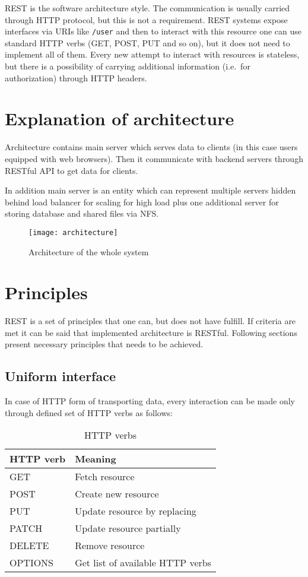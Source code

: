 REST is the software architecture style\cite{REST-wiki}. The communication is usually carried through HTTP protocol, but this is not a requirement. REST systems expose interfaces via URIs like\label{example-URI} \verb|/user| and then to interact with this resource one can use standard HTTP verbs (GET, POST, PUT and so on), but it does not need to implement all of them. Every new attempt to interact with resources is stateless, but there is a possibility of carrying additional information (i.e.\ for authorization) through HTTP headers.

\section{Explanation of architecture}
Architecture contains main server which serves data to clients (in this case users equipped with web browsers). Then it communicate with backend servers through RESTful API to get data for clients.

In addition main server is an entity which can represent multiple servers hidden behind load balancer for scaling for high load plus one additional server for storing database and shared files via NFS\@.

\begin{figure}[!htbp]
\centering
\texttt{[image: architecture]}
\label{fig:architecture}
\caption{Architecture of the whole system}
\end{figure}


\section{Principles}
REST is a set of principles that one can, but does not have fulfill. If criteria are met it can be said that implemented architecture is RESTful. Following sections present necessary principles that needs to be achieved.

\subsection{Uniform interface}
\label{uniform-interface}
In case of HTTP form of transporting data, every interaction can be made only through defined set of HTTP verbs as follows:

\begin{table}[!htbp]
\centering
\begin{tabular}{ll} \toprule
 HTTP verb &  Meaning \\ \midrule
 GET & Fetch resource \\
 POST & Create new resource \\
 PUT & Update resource by replacing \\
 PATCH & Update resource partially \\
 DELETE & Remove resource \\
 OPTIONS & Get list of available HTTP verbs \\ \bottomrule
\end{tabular}
\caption{HTTP verbs}
\label{tab:http-verbs}
\end{table}

